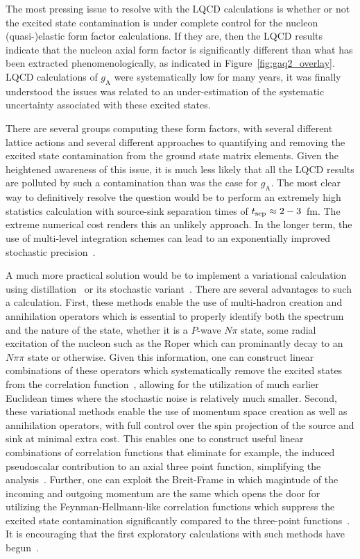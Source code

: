 The most pressing issue to  resolve with the LQCD calculations is whether or not the excited state contamination is under complete control for the nucleon (quasi-)elastic form factor calculations.
If they are, then the LQCD results indicate that the nucleon axial form factor is significantly different than what has been extracted phenomenologically, as indicated in Figure~\ref{fig:gaq2_overlay}.
 LQCD calculations of $g_{\mathrm{A}}$ were systematically low for many years,  it was finally understood the issues was related to an under-estimation of the systematic uncertainty associated with these excited states.

There are several groups computing these form factors, with several different lattice actions and several different approaches to quantifying and removing the excited state contamination from the ground state matrix elements.
Given the heightened awareness of this issue, it is much less likely that all the LQCD results are polluted by such a contamination than was the case for $g_{\mathrm{A}}$.
The most clear way to definitively resolve the question would be to perform an extremely high statistics calculation with source-sink separation times of $t_{\rm sep}\approx2-3$~fm.  The extreme numerical cost
renders this an unlikely approach.
In the longer term, the use of multi-level integration schemes can lead to an exponentially improved stochastic precision~\cite{Ce:2016idq}.

A much more practical solution would be to implement a variational calculation using distillation~\cite{HadronSpectrum:2009krc} or its stochastic variant~\cite{Morningstar:2011ka}.
There are several advantages to such a calculation.
First, these methods enable the use of multi-hadron creation and annihilation operators which is essential to properly identify both the spectrum and the nature of the state, whether it is a $P$-wave $N\pi$ state, some radial excitation of the nucleon such as the Roper which can prominantly decay to an $N\pi\pi$ state or otherwise.
Given this information, one can construct linear combinations of these operators which systematically remove the excited states from the correlation function~\cite{Blossier:2009kd}, allowing for the utilization of much earlier Euclidean times where the stochastic noise is relatively much smaller.
Second, these variational methods enable the use of momentum space creation as well as annihilation operators, with full control over the spin projection of the source and sink at minimal extra cost.
This enables one to construct useful linear combinations of correlation functions that eliminate for example, the induced pseudoscalar contribution to an axial three point function, simplifying the analysis~\cite{Meyer:2017ddy}.
Further, one can exploit the Breit-Frame in which magintude of the incoming and outgoing momentum are the same which opens the door for utilizing the Feynman-Hellmann-like correlation functions which suppress the excited state contamination significantly compared to the three-point functions~\cite{He:2021yvm}.
It is encouraging that the first exploratory calculations with such methods have begun~\cite{Egerer:2018xgu,Barca:2021iak}.


